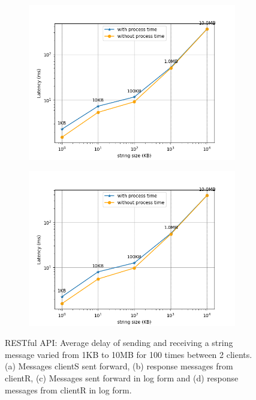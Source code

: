 \begin{figure}[htb]
    \begin{subfigure}[b]{0.49\textwidth}
        \centering
        \includegraphics[width=\textwidth]{figures/tests/proportional_tests/Rest_log_Average_string_messages_sending_time_of_100_tests.png}\hfill 
        \caption{} \label{fig: proportional-rest-stringsize-c}
    \end{subfigure}
    \begin{subfigure}[b]{0.49\textwidth}
        \centering
        \includegraphics[width=\textwidth]{figures/tests/proportional_tests/Rest_log_Average_string_messages_receiving_time_of_100_tests.png}\hfill 
        \caption{} \label{fig: proportional-rest-stringsize-d}
    \end{subfigure}
    \caption{RESTful API: Average delay of sending and receiving a string message varied from 1KB 
    to 10MB for 100 times between 2 clients. (a) Messages clientS sent forward, 
    (b) response messages from clientR, (c) Messages sent forward in log form 
    and (d) response messages from clientR in log form. 
    \label{fig: proportional-rest-stringsize}}
\end{figure}

